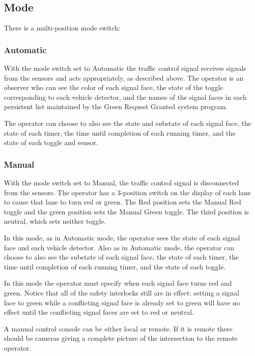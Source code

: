 \documentclass[letterpaper,twoside]{article}
\begin{document}
\subsection{Mode}

There is a multi-position mode switch:

\subsubsection{Automatic}

With the mode switch set to Automatic the traffic control signal
receives signals from the sensors and acts appropriately, as described
above.  The operator is an observer who can see the color of each
signal face, the state of the toggle corresponding to each vehicle detector,
and the names of the signal faces in each persistent list maintained by
the Green Request Granted system program.

The operator can choose to also see the state and substate of each signal
face, the state of each timer, the time until completion of each
running timer, and the state of each toggle and sensor.

\subsubsection{Manual}

With the mode switch set to Manual, the traffic control signal is
disconnected from the sensors.  The operator has
a 3-position switch on the display of each lane to cause that lane to turn red
or green.  The Red position sets the Manual
Red toggle and the green position sets the Manual Green toggle.
The third position is neutral, which sets neither toggle.

In this mode, as in Automatic mode, the operator sees the state of
each signal face and each vehicle detector.  Also as in Automatic mode,
the operator can choose to also see the substate of each signal face,
the state of each timer, the time until completion of each running
timer, and the state of each toggle.

In this mode the operator must specify when each signal face turns
red and green.  Notice that all of the safety interlocks still
are in effect: setting a signal face to green while a conflicting
signal face is already set to green will have no effect until the
conflicting signal faces are set to red or neutral.

A manual control console can be either local or remote.  If it is remote
there should be cameras giving a complete picture of the intersection
to the remote operator.
\end{document}
